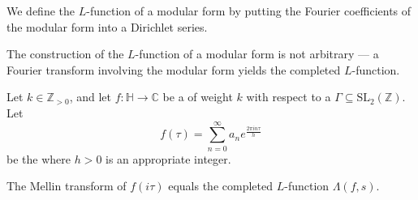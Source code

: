 

We define the $L$-function of a modular form by putting the Fourier coefficients of the modular form into a Dirichlet series.



The construction of the $L$-function of a modular form is not arbitrary --- a Fourier transform involving the modular form yields the completed $L$-function.

\begin{theorem}
Let $k \in \mathbb{Z}_{>0}$, and let $f:\mathbb{H}\to\mathbb{C}$ be a  of weight $k$ with respect to a  $\Gamma \subseteq \mathrm{SL}_2(\mathbb{Z})$. Let
$$ f(\tau) = \sum_{n=0}^\infty a_n e^{\frac{2\pi i n \tau}{h}} $$
be the  where $h > 0$ is an appropriate integer. 

The Mellin transform of $f(i\tau)$ equals the completed $L$-function $\Lambda(f,s)$.
\end{theorem}

